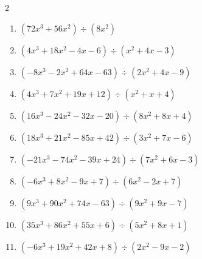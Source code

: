 \begin{multicols}{2}
\begin{enumerate}
        \phantom{$商 : -x-2, \quad 剰余 : 8x+9$}

  \item $(72x^{3}+56x^{2}) \div (8x^{2})$

        \phantom{$商 : 9x+7, \quad 剰余 : 5x-7$}

  \item $(4x^{3}+18x^{2}-4x-6) \div (x^{2}+4x-3)$

        \phantom{$商 : 4x+2, \quad 剰余 : 8x-4$}

\columnbreak %

  \item $(-8x^{3}-2x^{2}+64x-63) \div (2x^{2}+4x-9)$

        \phantom{$商 : -4x+7, \quad 剰余 : -8x+7$}

  \item $(4x^{3}+7x^{2}+19x+12) \div (x^{2}+x+4)$

        \phantom{$商 : 4x+3, \quad 剰余 : 8x-8$}

  \item $(16x^{3}-24x^{2}-32x-20) \div (8x^{2}+8x+4)$

        \phantom{$商 : 2x-5, \quad 剰余 : 9x-8$}

  \item $(18x^{3}+21x^{2}-85x+42) \div (3x^{2}+7x-6)$

        \phantom{$商 : 6x-7, \quad 剰余 : 9x-3$}

  \item $(-21x^{3}-74x^{2}-39x+24) \div (7x^{2}+6x-3)$

        \phantom{$商 : -3x-8, \quad 剰余 : -5x+2$}

\columnbreak %

\resetques

  \item $(-6x^{3}+8x^{2}-9x+7) \div (6x^{2}-2x+7)$

        \phantom{$商 : -x+1, \quad 剰余 : -x-4$}

  \item $(9x^{3}+90x^{2}+74x-63) \div (9x^{2}+9x-7)$

        \phantom{$商 : x+9, \quad 剰余 : -7$}

  \item $(35x^{3}+86x^{2}+55x+6) \div (5x^{2}+8x+1)$

        \phantom{$商 : 7x+6, \quad 剰余 : -x-6$}

  \item $(-6x^{3}+19x^{2}+42x+8) \div (2x^{2}-9x-2)$


\end{enumerate}
\end{multicols}
